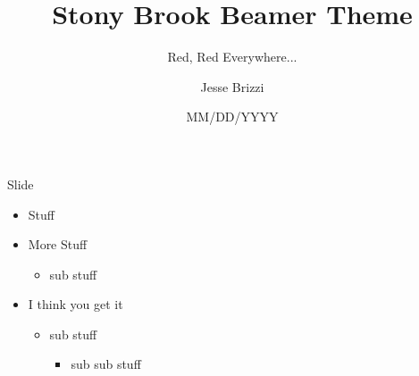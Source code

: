 \documentclass[xcolor=dvipsnames]{beamer}
\title{Stony Brook Beamer Theme}
\subtitle{Red, Red Everywhere...}
\author{Jesse Brizzi}
\date{MM/DD/YYYY}
\begin{document}
{
\begin{frame}
\titlepage
\end{frame}
}


\begin{frame}{Slide}
\begin{itemize}
    \item Stuff
    \item More Stuff
    \begin{itemize}
        \item sub stuff
    \end{itemize}
    \item I think you get it
    \begin{itemize}
        \item sub stuff
        \begin{itemize}
            \item sub sub stuff
        \end{itemize}
    \end{itemize}
\end{itemize}
\end{frame}
\end{document}
